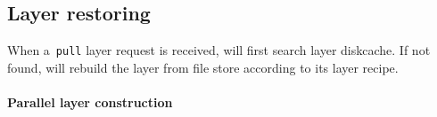 

\subsection{Layer restoring}




When a~\texttt{pull} layer request is received, 
\sysname will first search layer diskcache.
If not found,
\sysname will rebuild the layer from file store according to its layer recipe. 

\paragraph{Parallel layer construction}

